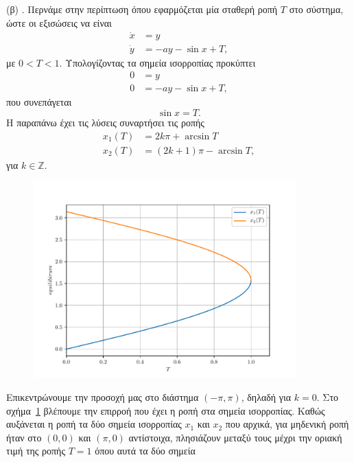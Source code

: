 \begin{solution}
    (β) . Περνάμε στην περίπτωση όπου εφαρμόζεται μία σταθερή ροπή
    \( T \) στο σύστημα, ώστε οι εξισώσεις να είναι
    \begin{align*}
        \dot{x} &= y \\
        \dot{y} &= -a y - \sin{x} + T,
    \end{align*}
    με \( 0 < T < 1 \). Υπολογίζοντας τα σημεία ισορροπίας προκύπτει
    \begin{align*}
        0 &= y \\
        0 &= -a y - \sin{x} + T,
    \end{align*}
    που συνεπάγεται
    \[
        \sin{x} = T.
    \]
    Η παραπάνω έχει τις λύσεις συναρτήσει τις ροπής
    \begin{align*}
        x_1(T) &= 2k\pi + \arcsin{T} \\
        x_2(T) &= (2k + 1)\pi - \arcsin{T},
    \end{align*}
    για \( k \in \mathbb{Z} \).
    \begin{figure}[h]
        \centering
        \includegraphics[width=0.9\textwidth]{figures/ex4_equilibriumPerTorque.pdf}
        \caption{}
        \label{fig:ex4_equilibriumPerTorque}
    \end{figure}
    Επικεντρώνουμε την προσοχή μας στο διάστημα \( (-\pi, \pi) \), δηλαδή για
    \( k = 0 \). Στο σχήμα~\ref{fig:ex4_equilibriumPerTorque} βλέπουμε την
    επιρροή που έχει η ροπή στα σημεία ισορροπίας. Καθώς αυξάνεται η ροπή τα
    δύο σημεία ισορροπίας \( x_1 \) και \( x_2 \) που αρχικά, για μηδενική
    ροπή ήταν στο \( (0, 0) \) και \( (\pi, 0) \) αντίστοιχα, πλησιάζουν μεταξύ τους
    μέχρι την οριακή τιμή της ροπής \( T = 1 \) όπου αυτά τα δύο σημεία

\end{solution}
